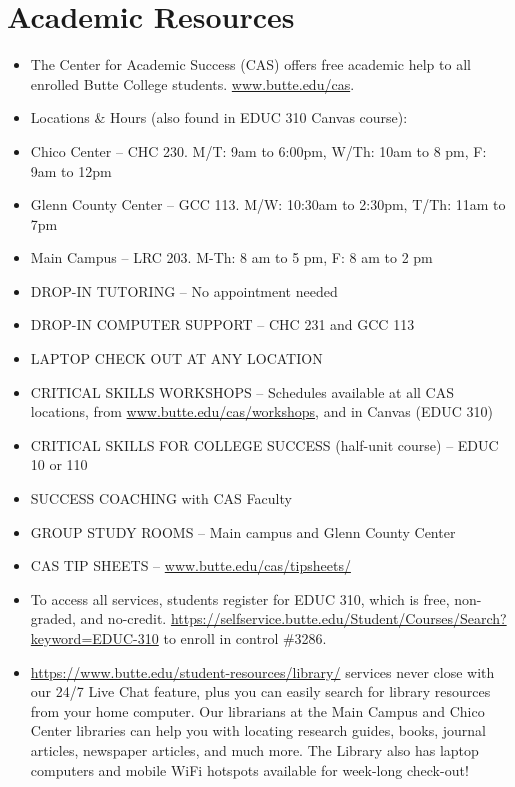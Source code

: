 \documentclass[12pt]{article}
\begin{document}
	\section*{Academic Resources}
	\begin{itemize}
		\item The Center for Academic Success (CAS) offers free academic help to all enrolled Butte College students. \url{www.butte.edu/cas}.

		\item Locations \& Hours (also found in EDUC 310 Canvas course):

		\item Chico Center – CHC 230. M/T: 9am to 6:00pm, W/Th: 10am to 8 pm, F: 9am to 12pm

		\item Glenn County Center – GCC 113. M/W: 10:30am to 2:30pm, T/Th: 11am to 7pm

		\item Main Campus – LRC 203.  M-Th: 8 am to 5 pm, F: 8 am to 2 pm

		\item DROP-IN TUTORING – No appointment needed
		\item DROP-IN COMPUTER SUPPORT – CHC 231 and GCC 113 
		\item LAPTOP CHECK OUT AT ANY LOCATION 
		\item CRITICAL SKILLS WORKSHOPS – Schedules available at all CAS locations, from \url{www.butte.edu/cas/workshops}, and in Canvas (EDUC 310)
		\item CRITICAL SKILLS FOR COLLEGE SUCCESS (half-unit course) – EDUC 10 or 110
		\item SUCCESS COACHING with CAS Faculty 
		\item GROUP STUDY ROOMS – Main campus and Glenn County Center 
		\item CAS TIP SHEETS – \url{www.butte.edu/cas/tipsheets/}
		 

		\item To access all services, students register for EDUC 310, which is free, non-graded, and no-credit. \href{Follow this link}{https://selfservice.butte.edu/Student/Courses/Search?keyword=EDUC-310} to enroll in control \#3286.

		\item \href{Butte College Library}{https://www.butte.edu/student-resources/library/} services never close with our 24/7 Live Chat feature, plus you can easily search for library resources from your home computer. Our librarians at the Main Campus and Chico Center libraries can help you with locating research guides, books, journal articles, newspaper articles, and much more. The Library also has laptop computers and mobile WiFi hotspots available for week-long check-out!

	\end{itemize}

	\nocite{*}

	\newpage %
	\backmatter
	\printbibliography

	\newpage %
	\printindex

	\newpage %
	\appendix
\end{document}
